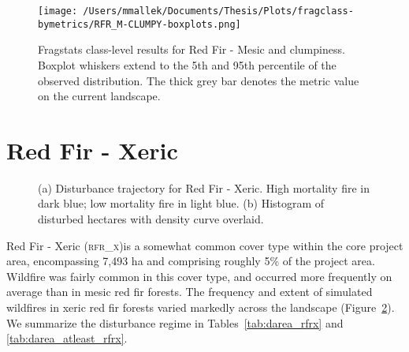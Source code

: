 \begin{figure}[!htbp]
\centering
    \texttt{[image: /Users/mmallek/Documents/Thesis/Plots/fragclass-bymetrics/RFR\_M-CLUMPY-boxplots.png]}
  \caption{Fragstats class-level results for Red Fir - Mesic and clumpiness. Boxplot whiskers extend to the 5th and 95th percentile of the observed distribution. The thick grey bar denotes the metric value on the current landscape.}
  \label{fig:rfrm_clumpy}
\end{figure}


\clearpage
\section{Red Fir - Xeric} 

\begin{figure}[!htbp]
  \centering
  \caption{\small (a) Disturbance trajectory for Red Fir - Xeric. High mortality fire in dark blue; low mortality fire in light blue. (b) Histogram of disturbed hectares with density curve overlaid.} 
  \label{fig:darea_rfrx}
\end{figure}

Red Fir - Xeric (\textsc{rfr\_x})is a somewhat common cover type within the core project area, encompassing 7,493 ha and comprising roughly 5\% of the project area. Wildfire was fairly common in this cover type, and occurred more frequently on average than in mesic red fir forests.
The frequency and extent of simulated wildfires in xeric red fir forests varied markedly across the landscape (Figure~\ref{fig:darea_rfrx}). We summarize the disturbance regime in Tables~\ref{tab:darea_rfrx} and \ref{tab:darea_atleast_rfrx}.


